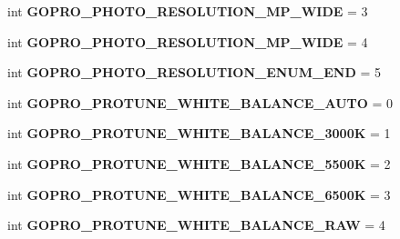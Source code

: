\begin{DoxyCompactItemize}
int {\bfseries G\+O\+P\+R\+O\+\_\+\+P\+H\+O\+T\+O\+\_\+\+R\+E\+S\+O\+L\+U\+T\+I\+O\+N\+\_\+M\+P\+\_\+\+W\+I\+DE} = 3
\item 
\mbox{\label{namespacepymavlink_1_1dialects_1_1v10_a49be4fc9355767b140d5fc25d3ff5d66}} 
int {\bfseries G\+O\+P\+R\+O\+\_\+\+P\+H\+O\+T\+O\+\_\+\+R\+E\+S\+O\+L\+U\+T\+I\+O\+N\+\_\+M\+P\+\_\+\+W\+I\+DE} = 4
\item 
\mbox{\label{namespacepymavlink_1_1dialects_1_1v10_adeb1b711aef0656b720a140217cfd82f}} 
int {\bfseries G\+O\+P\+R\+O\+\_\+\+P\+H\+O\+T\+O\+\_\+\+R\+E\+S\+O\+L\+U\+T\+I\+O\+N\+\_\+\+E\+N\+U\+M\+\_\+\+E\+ND} = 5
\item 
\mbox{\label{namespacepymavlink_1_1dialects_1_1v10_a6e09c2c910bbdecbdb6cada7cdf24189}} 
int {\bfseries G\+O\+P\+R\+O\+\_\+\+P\+R\+O\+T\+U\+N\+E\+\_\+\+W\+H\+I\+T\+E\+\_\+\+B\+A\+L\+A\+N\+C\+E\+\_\+\+A\+U\+TO} = 0
\item 
\mbox{\label{namespacepymavlink_1_1dialects_1_1v10_a61f1190fcd8902c5c1f46d3ba6537d56}} 
int {\bfseries G\+O\+P\+R\+O\+\_\+\+P\+R\+O\+T\+U\+N\+E\+\_\+\+W\+H\+I\+T\+E\+\_\+\+B\+A\+L\+A\+N\+C\+E\+\_\+3000K} = 1
\item 
\mbox{\label{namespacepymavlink_1_1dialects_1_1v10_a307ea55d18e451af812c1ebe1d569ea0}} 
int {\bfseries G\+O\+P\+R\+O\+\_\+\+P\+R\+O\+T\+U\+N\+E\+\_\+\+W\+H\+I\+T\+E\+\_\+\+B\+A\+L\+A\+N\+C\+E\+\_\+5500K} = 2
\item 
\mbox{\label{namespacepymavlink_1_1dialects_1_1v10_a50edfb3a57b31d0c4c60aaa19c9bc691}} 
int {\bfseries G\+O\+P\+R\+O\+\_\+\+P\+R\+O\+T\+U\+N\+E\+\_\+\+W\+H\+I\+T\+E\+\_\+\+B\+A\+L\+A\+N\+C\+E\+\_\+6500K} = 3
\item 
\mbox{\label{namespacepymavlink_1_1dialects_1_1v10_a700e79f683eed40920ca313f7042e81c}} 
int {\bfseries G\+O\+P\+R\+O\+\_\+\+P\+R\+O\+T\+U\+N\+E\+\_\+\+W\+H\+I\+T\+E\+\_\+\+B\+A\+L\+A\+N\+C\+E\+\_\+\+R\+AW} = 4
\item 
\mbox{\label{namespacepymavlink_1_1dialects_1_1v10_abca91caac5a3155151a1df05120459e5}} 

\end{DoxyCompactItemize}

